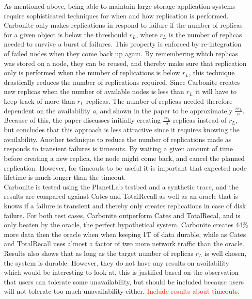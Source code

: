\documentclass{article}
\begin{document}
\noindent As mentioned above, being able to maintain large storage application systems require sophisticated techniques for when and how replication is performed. Carbonite only makes replications in respond to failure if the number of replicas for a given object is below the threshould $r_L$, where $r_L$ is the number of replicas needed to survive a burst of failures. This property is enforced by re-integration of failed nodes when they come back up again. By remembering which replicas was stored on a node, they can be reused, and thereby make sure that replication only is performed when the number of replications is below $r_L$, this technique drastically reduces the number of replications required. Since Carbonite creates new replicas when the number of available nodes is less than $r_L$ it will have to keep track of more than $r_L$ replicas. The number of replicas needed therefore dependent on the availability \textit{a}, and shown in the paper to be approximately $\frac{rr_L}{a}$. Because of this, the paper discusses initially creating $\frac{rr_L}{a}$ replicas instead of $r_L$, but concludes that this approach is less attractive since it requires knowing the availability.
Another technique to reduce the number of replications made as responds to transient failures is timeouts. By waiting a given amount of time before creating a new replica, the node might come back, and cancel the planned replication. However, for timeouts to be useful it is important that  expected node lifetime is much longer than the timeout.\\

\noindent Carbonite is tested using the PlanetLab testbed and a synthetic trace, and the results are compared against Cates and TotalRecall as well as an oracle that is knows if a failure is transient and thereby only creates replications in case of disk failure. For both test cases, Carbonite outperform Cates and TotalRecal, and is only beaten by the oracle, the perfect hypothetical system. Carbonite creates 44\% more data then the oracle when when keeping 1T of data durable, while as Cates and TotalRecall uses almost a factor of two more network traffic than the oracle. Results also shows that as long as the target number of replicas $r_L$ is well chosen, the system is durable. However, they do not have any results on availability which would be interesting to look at, this is justified based on the observation that users can tolerate some unavailability, but should be included because users will not tolerate too much unavailability either. \textcolor{red}{Include results about timeouts.}\\
\end{document}
